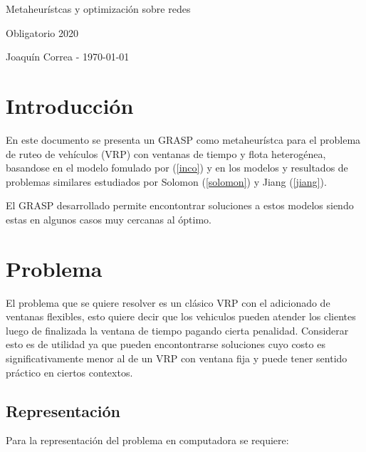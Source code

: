 \documentclass{article}
\begin{document}
  \begin{center}
    {\sc \large Metaheurístcas y optimización sobre redes}
    
    {\sc \large Obligatorio 2020}
    \linebreak

    {\rm Joaquín Correa - \today}
  \end{center}

  \section*{Introducción}

  En este documento se presenta un GRASP como metaheurístca para el problema de ruteo de vehículos (VRP) con ventanas de tiempo y flota heterogénea, basandose en el modelo fomulado por (\ref{inco}) y en los modelos y resultados de problemas similares estudiados por Solomon (\ref{solomon}) y Jiang (\ref{jiang}).

  El GRASP desarrollado permite encontontrar soluciones a estos modelos siendo estas en algunos casos muy cercanas al óptimo.

  \section*{Problema}

  El problema que se quiere resolver es un clásico VRP con el adicionado de ventanas flexibles, esto quiere decir que los vehiculos pueden atender los clientes luego de finalizada la ventana de tiempo pagando cierta penalidad. Considerar esto es de utilidad ya que pueden encontontrarse soluciones cuyo costo es significativamente menor al de un VRP con ventana fija y puede tener sentido práctico en ciertos contextos.

  \subsection*{Representación}

  Para la representación del problema en computadora se requiere:
  
\end{document}
